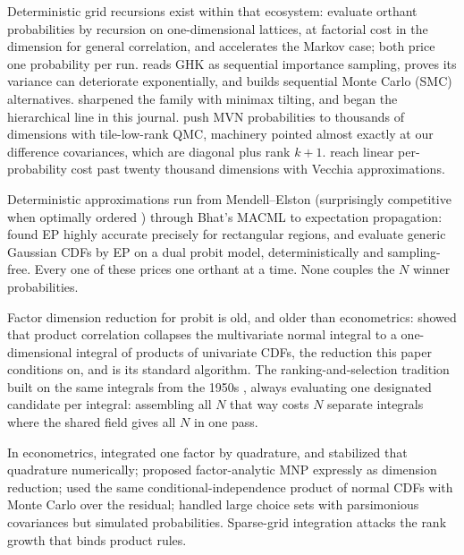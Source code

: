 \documentclass[12pt]{article}
\theoremstyle{remark}
\begin{document}
Deterministic grid recursions exist within that ecosystem: \citet{miwa2003}
evaluate orthant probabilities by recursion on one-dimensional lattices,
at factorial cost in the dimension for general correlation, and
\citet{craig2008} accelerates the Markov case; both price one
probability per run. \citet{ridgway2016} reads GHK as sequential importance sampling, proves its
variance can deteriorate exponentially, and builds sequential Monte
Carlo (SMC) alternatives. \citet{botev2017} sharpened the family with
minimax tilting, and \citet{genton2018} began the hierarchical line in
this journal. \citet{cao2021} push MVN probabilities to thousands of
dimensions with tile-low-rank QMC, machinery pointed almost exactly at
our difference covariances, which are diagonal plus rank $k+1$.
\citet{cao2025} reach linear per-probability cost past twenty thousand
dimensions with Vecchia approximations.

Deterministic approximations run from Mendell--Elston \citep{mendell1974}
(surprisingly competitive when optimally ordered \citep{connors2014})
through Bhat's MACML \citep{bhat2011} to expectation propagation:
\citet{cunningham2011} found EP
highly accurate precisely for rectangular regions, and \citet{fasano2025} evaluate generic Gaussian CDFs by EP on a dual probit
model, deterministically and sampling-free. Every one of these prices one
orthant at a time. None couples the $N$ winner probabilities.

Factor dimension reduction for probit is old, and older than
econometrics: \citet{curnow1962} showed that product correlation
collapses the multivariate normal integral to a one-dimensional integral
of products of univariate CDFs, the reduction this paper conditions on,
and \citet{dunnett1989} is its standard algorithm. The ranking-and-selection
tradition built on the same integrals from the 1950s
\citep{bechhofer1954,gupta1963}, always evaluating one designated
candidate per integral: assembling all $N$ that way costs $N$ separate
integrals where the shared field gives all $N$ in one pass.

In
econometrics, \citet{butler1982} integrated one factor by quadrature,
and \citet{lee2000} stabilized that quadrature numerically;
\citet{mcfadden1984} proposed factor-analytic MNP expressly as dimension
reduction; \citet{stern1992} used the same conditional-independence
product of normal CDFs with Monte Carlo over the residual;
\citet{bolduc1999} handled large choice sets with parsimonious
covariances but simulated probabilities. Sparse-grid integration
\citep{heiss2008} attacks the rank growth that binds product rules.
\end{document}

